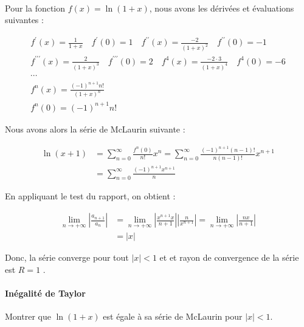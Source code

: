 \documentclass{report}
\begin{document}
\begin{multicols*}{2}
      \mbox{}\\
      Pour la fonction $f(x) = \ln(1 + x)$, nous avons les dérivées et 
      évaluations suivantes : 

      \begin{align*}
        f^{\prime}(x) = \frac{1}{1 + x}   
            \quad f^{\prime}(0) = 1 \quad 
        f^{\prime\prime}(x) =  \frac{-2}{(1 + x)^2} 
            \quad f^{\prime\prime}(0) =  -1 
        \\ 
        f^{\prime\prime\prime}(x) = \frac{2}{(1 + x)^3} 
            \quad f^{\prime\prime\prime}(0) = 2 \quad
        f^{4}(x) = \frac{-2 \cdot 3}{(1 + x)^4} 
            \quad f^{4}(0) = -6 
            \\
            \cdots 
            \\
            f^{n}(x) = \frac{(-1)^{n+1}n!}{(1 + x)^n} 
            \\ 
            f^{n}(0) = (-1)^{n+1}n!
      \end{align*}

      Nous avons alors la série de McLaurin suivante : 
      

      \begin{align*}
        \ln(x + 1) &= \sum_{n=0}^{\infty }\frac{f^{n}(0)}{n!}x^n 
          = 
          \sum_{n=0}^{\infty }\frac{(-1)^{n+1}(n-1)!}{n(n-1)!}x^{n+1}          
          \\ 
          &= 
          \sum_{n=0}^{\infty }\frac{(-1)^{n+1}x^{n+1}}{n} 
      \end{align*}

      En appliquant le test du rapport, on obtient :

      \begin{align*}
          \lim\limits_{n \to+\infty } 
              \left| 
              \frac{a_{n+1}}{a_n} 
              \right|
          &= 
          \lim\limits_{n \to+\infty }       
          \left| 
          \frac{x^{n+1}x}{n+1} 
          \right| 
          \left|
          \frac{n}{x^{n+1}} 
          \right|
          = 
          \lim\limits_{n \to+\infty }  
          \left| 
          \frac{nx}{n+1} 
          \right|
          \\ 
          &= 
          |x| 
      \end{align*}  

      Donc, la série converge pour tout $|x| < 1$ et et rayon de 
      convergence de la série est $R = 1$ . 

      \paragraph{Inégalité de Taylor}
      Montrer que $\ln(1 + x)$ est égale à sa série de 
      McLaurin pour $|x| < 1$. 


\end{multicols*}
\end{document}
